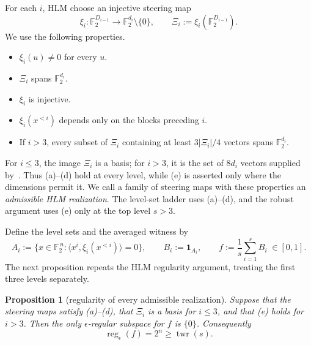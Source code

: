 \documentclass[10pt,a4paper]{amsart}
\newtheorem{proposition}[theorem]{Proposition}
\numberwithin{theorem}{section}
\newcommand{\F}{\mathbb{F}}
\newcommand{\inner}[2]{\langle #1,#2\rangle}
\newcommand{\abs}[1]{\lvert #1\rvert}
\newcommand{\twr}{\operatorname{twr}}
\newcommand{\reg}{\operatorname{reg}}
\newcommand{\Xii}{\Xi}
\begin{document}
For each $i$, HLM choose an injective steering map
\[
  \xi_i\colon\F_2^{D_{i-1}}\longrightarrow
  \F_2^{d_i}\setminus\{0\},
  \qquad \Xii_i:=\xi_i(\F_2^{D_{i-1}}).
\]
We use the following properties.
\begin{itemize}
\item[(a)] $\xi_i(u)\ne0$ for every $u$.
\item[(b)] $\Xii_i$ spans $\F_2^{d_i}$.
\item[(c)] $\xi_i$ is injective.
\item[(d)] $\xi_i(x^{<i})$ depends only on the blocks preceding $i$.
\item[(e)] If $i>3$, every subset of $\Xii_i$ containing at least
  $3\abs{\Xii_i}/4$ vectors spans $\F_2^{d_i}$.
\end{itemize}
For $i\le3$, the image $\Xii_i$ is a basis; for $i>3$, it is the set of
$8d_i$ vectors supplied by~\cite[Claim~2.1]{HLM}.  Thus (a)--(d) hold at
every level, while (e) is asserted only where the dimensions permit it.  We
call a family of steering maps with these properties an \emph{admissible HLM
realization}.  The level-set ladder uses (a)--(d), and the robust argument
uses (e) only at the top level $s>3$.

Define the level sets and the averaged witness by
\[
  A_i:=\bigl\{x\in\F_2^{\,n}:\inner{x^i}{\xi_i(x^{<i})}=0\bigr\},
  \qquad B_i:=\mathbf 1_{A_i},\qquad
  f:=\frac1s\sum_{i=1}^s B_i\;\in[0,1].
\]
The next proposition repeats the HLM regularity argument, treating the first
three levels separately.

\begin{proposition}[regularity of every admissible realization]
\label{prop:hlm-regularity}
Suppose that the steering maps satisfy (a)--(d), that $\Xii_i$ is a basis for
$i\le3$, and that (e) holds for $i>3$. Then the only
$\epsilon$-regular subspace for $f$ is $\{0\}$. Consequently
\[
  \reg_\epsilon(f)=2^n\ge\twr(s).
\]
\end{proposition}
\end{document}
